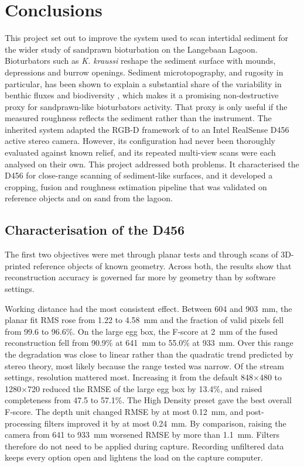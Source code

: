 \chapter{Conclusions}
\label{ch:conclusions}

This project set out to improve the system used to scan intertidal sediment for the wider study of sandprawn bioturbation on the Langebaan Lagoon. Bioturbators such as \textit{K. kraussi} reshape the sediment surface with mounds, depressions and burrow openings. Sediment microtopography, and rugosity in particular, has been shown to explain a substantial share of the variability in benthic fluxes and biodiversity \citep{schenoneSedimentMicrotopographyPredicts2024, schenoneSeafloorSedimentMicrotopography2025}, which makes it a promising non-destructive proxy for sandprawn-like bioturbators activity. That proxy is only useful if the measured roughness reflects the sediment rather than the instrument. The inherited system adapted the RGB-D framework of \citet{azharRGBDFrameworkCapturing2022} to an Intel RealSense D456 active stereo camera. However, its configuration had never been thoroughly evaluated against known relief, and its repeated multi-view scans were each analysed on their own. This project addressed both problems. It characterised the D456 for close-range scanning of sediment-like surfaces, and it developed a cropping, fusion and roughness estimation pipeline that was validated on reference objects and on sand from the lagoon.

\section*{Characterisation of the D456}

The first two objectives were met through planar tests and through scans of 3D-printed reference objects of known geometry. Across both, the results show that reconstruction accuracy is governed far more by geometry than by software settings.

Working distance had the most consistent effect. Between 604 and 903~mm, the planar fit RMS rose from 1.22 to 4.58~mm and the fraction of valid pixels fell from 99.6 to 96.6\%. On the large egg box, the F-score at 2~mm of the fused reconstruction fell from 90.9\% at 641~mm to 55.0\% at 933~mm. Over this range the degradation was close to linear rather than the quadratic trend predicted by stereo theory, most likely because the range tested was narrow. Of the stream settings, resolution mattered most. Increasing it from the default 848$\times$480 to 1280$\times$720 reduced the RMSE of the large egg box by 13.4\%, and raised completeness from 47.5 to 57.1\%. The High Density preset gave the best overall F-score. The depth unit changed RMSE by at most 0.12~mm, and post-processing filters improved it by at most 0.24~mm. By comparison, raising the camera from 641 to 933~mm worsened RMSE by more than 1.1~mm. Filters therefore do not need to be applied during capture. Recording unfiltered data keeps every option open and lightens the load on the capture computer.

